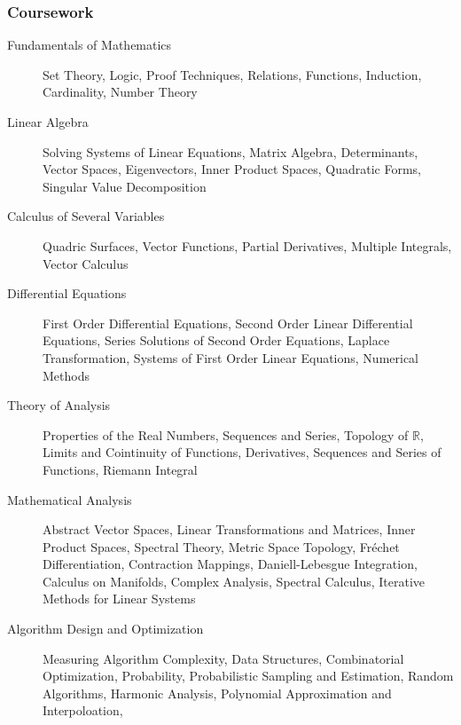 \documentclass[11pt, letterpaper]{article}
\begin{document}
    \subsubsection{Coursework}
      \begin{description}
        \item [Fundamentals of Mathematics] 
          Set Theory, 
          Logic, 
          Proof Techniques, 
          Relations,
          Functions, 
          Induction,
          Cardinality, 
          Number Theory
        \item [Linear Algebra]
          Solving Systems of Linear Equations,
          Matrix Algebra,
          Determinants,
          Vector Spaces,
          Eigenvectors,
          Inner Product Spaces,
          Quadratic Forms,
          Singular Value Decomposition
        \item [Calculus of Several Variables]
          Quadric Surfaces,
          Vector Functions,
          Partial Derivatives,
          Multiple Integrals,
          Vector Calculus
        \item [Differential Equations]
          First Order Differential Equations,
          Second Order Linear Differential Equations,
          Series Solutions of Second Order Equations,
          Laplace Transformation,
          Systems of First Order Linear Equations,
          Numerical Methods
        \item [Theory of Analysis]
          Properties of the Real Numbers,
          Sequences and Series,
          Topology of $\mathbb{R}$,
          Limits and Cointinuity of Functions,
          Derivatives,
          Sequences and Series of Functions,
          Riemann Integral
        \item [Mathematical Analysis]
          Abstract Vector Spaces,
          Linear Transformations and Matrices,
          Inner Product Spaces,
          Spectral Theory,
          Metric Space Topology,
          Fr\'echet Differentiation,
          Contraction Mappings,
          Daniell-Lebesgue Integration,
          Calculus on Manifolds,
          Complex Analysis,
          Spectral Calculus,
          Iterative Methods for Linear Systems
        \item [Algorithm Design and Optimization]
          Measuring Algorithm Complexity,
          Data Structures,
          Combinatorial Optimization,
          Probability,
          Probabilistic Sampling and Estimation,
          Random Algorithms,
          Harmonic Analysis,
          Polynomial Approximation and Interpoloation,

\end{description}
\end{document}
